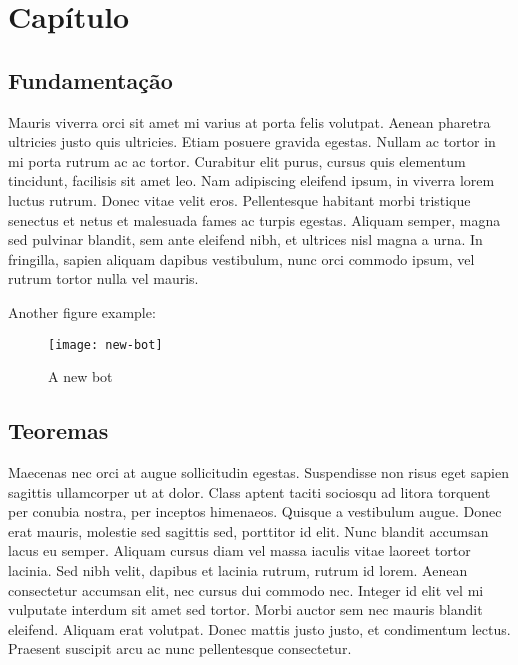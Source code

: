 
\chapter{Capítulo}


\section{Fundamentação }

Mauris viverra orci sit amet \citeauthor{article:dummy} mi varius at porta
felis volutpat. Aenean pharetra ultricies justo quis ultricies. Etiam
posuere gravida egestas. Nullam ac tortor in mi porta rutrum ac ac
tortor. Curabitur elit purus, cursus quis elementum tincidunt, facilisis
sit amet leo. Nam adipiscing eleifend ipsum, in viverra lorem luctus
rutrum. Donec vitae velit eros. Pellentesque habitant morbi tristique
senectus et netus et malesuada fames ac turpis egestas. Aliquam semper,
magna sed pulvinar blandit, sem ante eleifend nibh, et ultrices nisl
magna a urna. In fringilla, sapien aliquam dapibus vestibulum, nunc
orci commodo ipsum, vel rutrum tortor nulla vel mauris.

Another figure example:
\begin{figure}[H]
	\centering %
	\scriptsize %
	\texttt{[image: new-bot]}
	\caption{A new bot}
	\label{fig:newbot}
\end{figure}

\section{Teoremas}

Maecenas nec orci at augue sollicitudin egestas. Suspendisse non risus
eget sapien sagittis ullamcorper ut at dolor. Class aptent taciti
sociosqu ad litora torquent per conubia nostra, per inceptos himenaeos.
Quisque a vestibulum augue. Donec erat mauris, molestie sed sagittis
sed, porttitor id elit. Nunc blandit accumsan lacus eu semper. Aliquam
cursus diam vel massa iaculis vitae laoreet tortor lacinia. Sed nibh
velit, dapibus et lacinia rutrum, rutrum id lorem. Aenean consectetur
accumsan elit, nec cursus dui commodo nec. Integer id elit vel mi
vulputate interdum sit amet sed tortor. Morbi auctor sem nec mauris
blandit eleifend. Aliquam erat volutpat. Donec mattis justo justo,
et condimentum lectus. Praesent suscipit arcu ac nunc pellentesque
consectetur.

